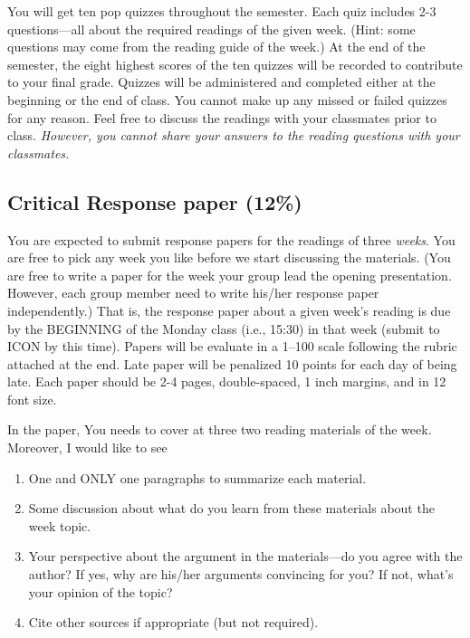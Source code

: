 \documentclass[11pt,]{article}
\providecommand{\tightlist}{%
  \setlength{\itemsep}{0pt}\setlength{\parskip}{0pt}}
\theoremstyle{definition}
\theoremstyle{definition}
\theoremstyle{remark}
\begin{document}
You will get ten pop quizzes throughout the semester. Each quiz includes
2-3 questions---all about the required readings of the given week.
(Hint: some questions may come from the reading guide of the week.) At
the end of the semester, the eight highest scores of the ten quizzes
will be recorded to contribute to your final grade. Quizzes will be
administered and completed either at the beginning or the end of class.
You cannot make up any missed or failed quizzes for any reason. Feel
free to discuss the readings with your classmates prior to class.
\emph{However, you cannot share your answers to the reading questions
with your classmates.}

\subsection{Critical Response paper
(12\%)}\label{critical-response-paper-12}

You are expected to submit response papers for the readings of three
\emph{weeks}. You are free to pick any week you like before we start
discussing the materials. (You are free to write a paper for the week
your group lead the opening presentation. However, each group member
need to write his/her response paper independently.) That is, the
response paper about a given week's reading is due by the BEGINNING of
the Monday class (i.e., 15:30) in that week (submit to ICON by this
time). Papers will be evaluate in a 1--100 scale following the rubric
attached at the end. Late paper will be penalized 10 points for each day
of being late. Each paper should be 2-4 pages, double-spaced, 1 inch
margins, and in 12 font size.

In the paper, You needs to cover at three two reading materials of the
week. Moreover, I would like to see

\begin{enumerate}
\def\labelenumi{\arabic{enumi}.}
\tightlist
\item
  One and ONLY one paragraphs to summarize each material.
\item
  Some discussion about what do you learn from these materials about the
  week topic.
\item
  Your perspective about the argument in the materials---do you agree
  with the author? If yes, why are his/her arguments convincing for you?
  If not, what's your opinion of the topic?
\item
  Cite other sources if appropriate (but not required).
\end{enumerate}
\end{document}
